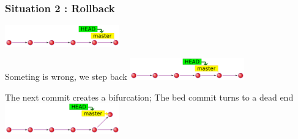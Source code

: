 \documentclass[aspectratio=169]{beamer}
\begin{document}
\begin{frame}
\frametitle<presentation>{Situation 2 : Rollback}

\begin{block}{}
	\includegraphics[width=140pt]{pictures/git-mater-head-simplest.png}
	\end{block}
	
	\begin{block}{Someting is wrong, we step back}
	\includegraphics[width=140pt]{pictures/git-mater-head-rollback.png}
	\end{block}
	
	\begin{block}{The next commit  creates a bifurcation; The bed commit turns to a dead end}
	\includegraphics[width=140pt]{pictures/git-mater-head-rollback-and-branch.png}
	\end{block}
	
	 
	
\end{frame}
\end{document}
